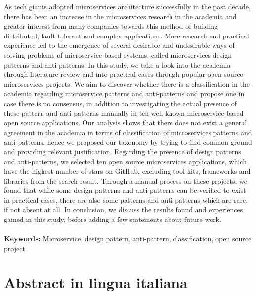 \documentclass{Configuration_Files/PoliMi3i_thesis}
\begin{document}
As tech giants adopted microservices architecture successfully in the past decade, there has been an increase in the microservices research in the academia and greater interest from many companies towards this method of building distributed, fault-tolerant and complex applications.
More research and practical experience led to the emergence of several desirable and undesirable ways of solving problems of microservice-based systems, called microservices design patterns and anti-patterns.
In this study, we take a look into the academia through literature review and into practical cases through popular open source microservices projects.
We aim to discover whether there is a classification in the academia regarding microservice patterns and anti-patterns and propose one in case there is no consensus, in addition to investigating the actual presence of these pattern and anti-patterns manually in ten well-known microservice-based open source applications.
Our analysis shows that there does not exist a general agreement in the academia in terms of classification of microservices patterns and anti-patterns, hence we proposed our taxonomy by trying to find common ground and providing relevant justification.
Regarding the presence of design patterns and anti-patterns, we selected ten open source microservices applications, which have the highest number of stars on GitHub, excluding tool-kits, frameworks and libraries from the search result.
Through a manual process on these projects, we found that while some design patterns and anti-patterns can be verified to exist in practical cases, there are also some patterns and anti-patterns which are rare, if not absent at all.
In conclusion, we discuss the results found and experiences gained in this study, before adding a few statements about future work.
\\
\\
\textbf{Keywords:} Microservice, design pattern, anti-pattern, classification, open source project %

\chapter*{Abstract in lingua italiana}
\end{document}

